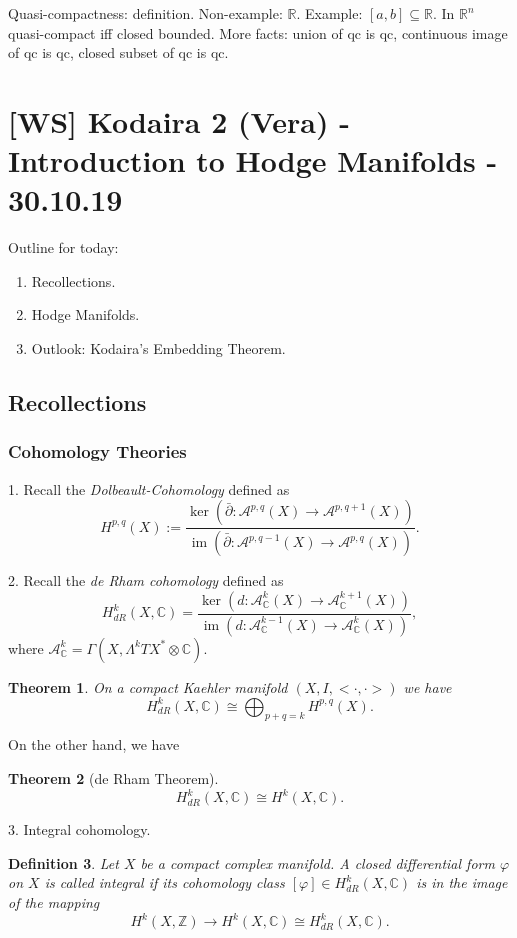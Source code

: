 \documentclass[12pt]{article}
\theoremstyle{darkgreentheorem}
\newtheorem{thm}{Theorem}
\theoremstyle{darkbluedefinition}
\newtheorem{defn}[thm]{Definition}
\theoremstyle{darkredexample}
\theoremstyle{remark}
\newcommand{\Z}{\mathbb{Z}}
\newcommand{\R}{\mathbb{R}}
\newcommand{\1}{\mathbbm{1}}
\newcommand{\C}{\mathbb{C}}
\newcommand{\A}{\mathscr{A}}
\DeclareMathOperator{\im}{im}
\newcommand{\ot}{\otimes}
\begin{document}
Quasi-compactness: definition.
Non-example: $\R$.
Example: $[a,b]\subseteq \R$.
In $\R^{n}$ quasi-compact iff closed bounded.
More facts: union of qc is qc, continuous image of qc is qc, closed subset of qc is qc.

\section{[WS] Kodaira 2 (Vera) - Introduction to Hodge Manifolds - 30.10.19}

Outline for today:
\begin{enumerate}[label=\arabic*)]
    \item Recollections.
    \item Hodge Manifolds.
    \item Outlook: Kodaira's Embedding Theorem.
\end{enumerate}

\subsection{Recollections}

\subsubsection{Cohomology Theories}

1. Recall the \textit{Dolbeault-Cohomology} defined as
\[ H^{p,q}(X):=\frac{\ker(\bar{\partial}\colon \A^{p,q}(X)\to \A^{p,q+1}(X))}{\im(\bar{\partial}\colon \A^{p,q-1}(X)\to \A^{p,q}(X))}.\]

2. Recall the \textit{de Rham cohomology} defined as
\[ H_{dR}^{k}(X,\C)=\frac{\ker(d\colon \A_{\C}^{k}(X)\to \A_{\C}^{k+1}(X))}{\im(d\colon \A_{\C}^{k-1}(X)\to \A_{\C}^{k}(X))}, \]
where $\A_{\C}^{k}=\Gamma(X,\Lambda^{k}TX^{*}\ot \C)$.

\begin{thm}
    On a compact Kaehler manifold $(X,I,<\cdot,\cdot>)$ we have
    \[ H_{dR}^{k}(X,\C)\cong \bigoplus_{p+q=k}H^{p,q}(X).\]
\end{thm}

On the other hand, we have

\begin{thm}[de Rham Theorem]
    \[ H_{dR}^{k}(X,\C)\cong H^{k}(X,\C).\]
\end{thm}

3. Integral cohomology.

\begin{defn}
    Let $X$ be a compact complex manifold.
    A closed differential form $\varphi$ on $X$ is called \textit{integral} if its cohomology class $[\varphi]\in H^{k}_{dR}(X,\C)$ is in the image of the mapping
    \[ H^{k}(X,\Z)\to H^{k}(X,\C)\cong H_{dR}^{k}(X,\C). \]
\end{defn}
\end{document}
